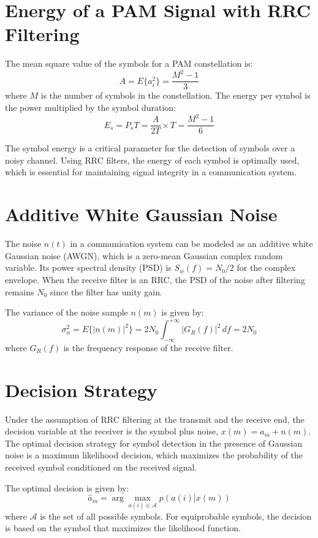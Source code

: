 \section*{Energy of a PAM Signal with RRC Filtering}

The mean square value of the symbols for a PAM constellation is:
\[ A = E\{a_i^2\} = \frac{M^2 - 1}{3} \]
where \( M \) is the number of symbols in the constellation. The energy per symbol is the power multiplied by the symbol duration:
\[ E_s = P_s T = \frac{A}{2T} \times T = \frac{M^2 - 1}{6} \]

The symbol energy is a critical parameter for the detection of symbols over a noisy channel. Using RRC filters, the energy of each symbol is optimally used, which is essential for maintaining signal integrity in a communication system.


\section*{Additive White Gaussian Noise}

The noise \( n(t) \) in a communication system can be modeled as an additive white Gaussian noise (AWGN), which is a zero-mean Gaussian complex random variable. Its power spectral density (PSD) is \( S_w(f) = N_0/2 \) for the complex envelope. When the receive filter is an RRC, the PSD of the noise after filtering remains \( N_0 \) since the filter has unity gain.

The variance of the noise sample \( n(m) \) is given by:
\[ \sigma_n^2 = E\{|n(m)|^2\} = 2N_0 \int_{-\infty}^{+\infty} |G_R(f)|^2 \, df = 2N_0 \]
where \( G_R(f) \) is the frequency response of the receive filter.

\section*{Decision Strategy}

Under the assumption of RRC filtering at the transmit and the receive end, the decision variable at the receiver is the symbol plus noise, \( x(m) = a_m + n(m) \). The optimal decision strategy for symbol detection in the presence of Gaussian noise is a maximum likelihood decision, which maximizes the probability of the received symbol conditioned on the received signal.

The optimal decision is given by:
\[ \hat{a}_m = \arg \max_{a(i) \in \mathcal{A}} p(a(i)|x(m)) \]
where \( \mathcal{A} \) is the set of all possible symbols. For equiprobable symbols, the decision is based on the symbol that maximizes the likelihood function.

